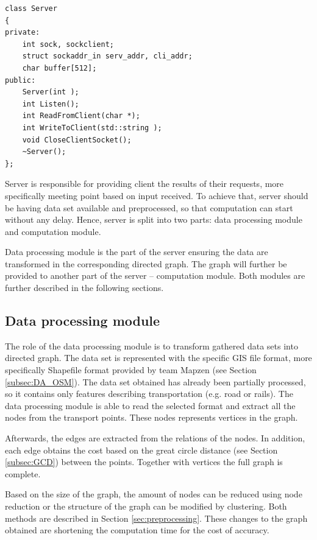 \documentclass[thesis=M,english]{FITthesis}[2012/10/20]
\begin{document}
\begin{lstlisting}[frame=single, caption={\texttt{Server} class}, label={lst:Server}]
class Server
{
private:
    int sock, sockclient;
	struct sockaddr_in serv_addr, cli_addr;
    char buffer[512];
public:
    Server(int );
    int Listen();
    int ReadFromClient(char *);
    int WriteToClient(std::string );
    void CloseClientSocket();
    ~Server();
};
\end{lstlisting}

Server is responsible for providing client the results of their requests, more specifically meeting point based on input received. To achieve that, server should be having data set available and preprocessed, so that computation can start without any delay. Hence, server is split into two parts: data processing module and computation module.

Data processing module is the part of the server ensuring the data are transformed in the corresponding directed graph. The graph will further be provided to another part of the server -- computation module. Both modules are further described in the following sections.


\subsection{Data processing module}
\label{subsec:dataprocessing} 
The role of the data processing module is to transform gathered data sets into directed graph. The data set is represented with the specific GIS file format, more specifically Shapefile format provided by team Mapzen (see Section \ref{subsec:DA_OSM}). The data set obtained has already been partially processed, so it contains only features describing transportation (e.g. road or rails). The data processing module is able to read the selected format and extract all the nodes from the transport points. These nodes represents vertices in the graph. 

Afterwards, the edges are extracted from the relations of the nodes. In addition, each edge obtains the cost based on the great circle distance (see Section \ref{subsec:GCD}) between the points. Together with vertices the full graph is complete.

Based on the size of the graph, the amount of nodes can be reduced using node reduction or the structure of the graph can be modified by clustering. Both methods are described in Section \ref{sec:preprocessing}. These changes to the graph obtained are shortening the computation time for the cost of accuracy. 
\end{document}
